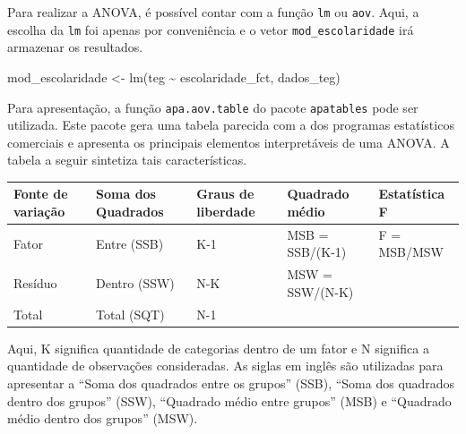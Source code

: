 \documentclass[
]{book}
\newenvironment{Shaded}{\begin{snugshade}}{\end{snugshade}}
\newcommand{\AttributeTok}[1]{\textcolor[rgb]{0.77,0.63,0.00}{#1}}
\newcommand{\ConstantTok}[1]{\textcolor[rgb]{0.00,0.00,0.00}{#1}}
\newcommand{\FunctionTok}[1]{\textcolor[rgb]{0.00,0.00,0.00}{#1}}
\newcommand{\NormalTok}[1]{#1}
\newcommand{\OtherTok}[1]{\textcolor[rgb]{0.56,0.35,0.01}{#1}}
\newcommand{\SpecialCharTok}[1]{\textcolor[rgb]{0.00,0.00,0.00}{#1}}
\begin{document}
Para realizar a ANOVA, é possível contar com a função \texttt{lm} ou \texttt{aov}. Aqui, a escolha da \texttt{lm} foi apenas por conveniência e o vetor \texttt{mod\_escolaridade} irá armazenar os resultados.

\begin{Shaded}
\begin{Highlighting}[]
\NormalTok{mod\_escolaridade }\OtherTok{\textless{}{-}} \FunctionTok{lm}\NormalTok{(teg }\SpecialCharTok{\textasciitilde{}}\NormalTok{ escolaridade\_fct, dados\_teg)}
\end{Highlighting}
\end{Shaded}

Para apresentação, a função \texttt{apa.aov.table} do pacote \texttt{apatables} pode ser utilizada. Este pacote gera uma tabela parecida com a dos programas estatísticos comerciais e apresenta os principais elementos interpretáveis de uma ANOVA. A tabela a seguir sintetiza tais características.

\begin{longtable}[]{@{}
  >{\raggedright\arraybackslash}p{}
  >{\raggedright\arraybackslash}p{}
  >{\raggedright\arraybackslash}p{}
  >{\raggedright\arraybackslash}p{}
  >{\raggedright\arraybackslash}p{}@{}}
\toprule
Fonte de variação & Soma dos Quadrados & Graus de liberdade & Quadrado médio & Estatística F \\
\midrule
\endhead
Fator & Entre (SSB) & K-1 & MSB = SSB/(K-1) & F = MSB/MSW \\
Resíduo & Dentro (SSW) & N-K & MSW = SSW/(N-K) & \\
Total & Total (SQT) & N-1 & & \\
\bottomrule
\end{longtable}

Aqui, K significa quantidade de categorias dentro de um fator e N significa a quantidade de observações consideradas. As siglas em inglês são utilizadas para apresentar a ``Soma dos quadrados entre os grupos'' (SSB), ``Soma dos quadrados dentro dos grupos'' (SSW), ``Quadrado médio entre grupos'' (MSB) e ``Quadrado médio dentro dos grupos'' (MSW).

\begin{Shaded}
\end{Shaded}
\end{document}
